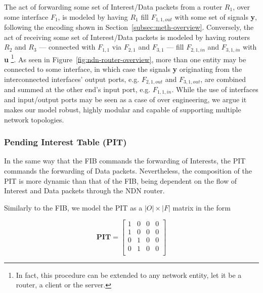 The act of forwarding some set of Interest\slash Data packets from a router $R_1$, 
over some interface $F_1$, is modeled by having $R_1$ fill $F_{1,1,out}$ with 
some set of signals \textbf{y}, following the encoding shown in 
Section~\ref{subsec:meth-overview}. Conversely, the act of receiving some set 
of Interest\slash Data packets is modeled by having routers $R_2$ and $R_3$ --- 
connected with $F_{1,1}$ via $F_{2,1}$ and $F_{3,1}$ --- fill $F_{2,1,in}$ and $F_{3,1,in}$ 
with \textbf{u} \footnote{In fact, this procedure can be extended to any network entity, let 
it be a router, a client or the server.}. As seen in Figure~\ref{fig:ndn-router-overview}, 
more than one entity may be connected to some interface, in which case the 
signals \textbf{y} originating from the interconnected interfaces' output ports, 
e.g. $F_{2,1,out}$ and $F_{3,1,out}$, are combined and summed at the other 
end's input port, e.g. $F_{1,1,in}$. While the use of interfaces and 
input\slash output ports may be seen as a case of over engineering, we argue 
it makes our model robust, highly modular and capable of supporting multiple 
network topologies.\shortvertbreak

\subsubsection{Pending Interest Table (PIT)}
\label{subsec:meth-pit}

In the same way that the FIB commands the forwarding of Interests, the PIT 
commands the forwarding of Data packets. Nevertheless, the composition of the 
PIT is more dynamic than that of the FIB, being dependent on the flow of 
Interest and Data packets through the NDN router.\shortvertbreak

Similarly to the FIB, we model the PIT as a $|O| \times |F|$ matrix in the 
form

\begin{equation}
\textbf{PIT} = \begin{bmatrix} 1 & 0 & 0 & 0  \\ 
                1 & 0 & 0 & 0               \\ 
                0 & 1 & 0 & 0               \\ 
                0 & 1 & 0 & 0               \\ \end{bmatrix}
    \label{eq:pit}
\end{equation}\shortvertbreak

